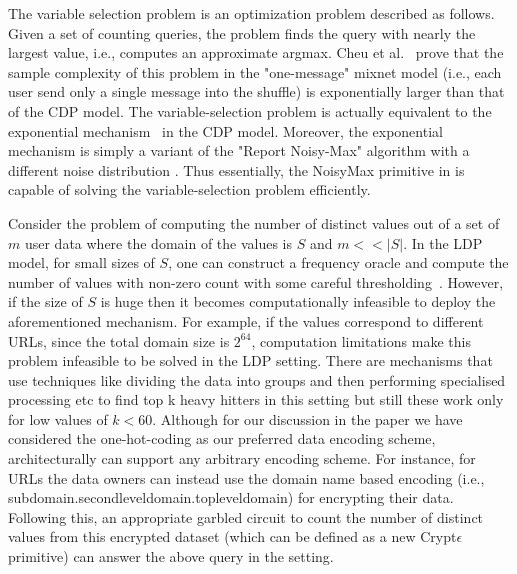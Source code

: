  The variable selection problem is an optimization problem described as follows. Given a set of counting queries, the problem finds the query with nearly the largest value, i.e., computes an approximate argmax. Cheu et al.~\cite{mixnets} prove that the sample complexity of this problem in the "one-message" mixnet model (i.e., each user send only a single message into the shuffle) is exponentially larger than that of the \textsf{CDP} model. The variable-selection problem is actually equivalent to the exponential mechanism~\cite{Dork} in the \textsf{CDP} model. Moreover, the exponential mechanism is simply a variant of the "Report Noisy-Max" algorithm with a different noise distribution \cite{Nm}.  Thus essentially, the \textsf{NoisyMax} primitive in \system is capable of solving the variable-selection problem efficiently.

 Consider the problem of computing the number of distinct values out of a set of $m$ user data where the domain of the values is $S$ and $m<<|S|$. In the \textsf{LDP} model, for small sizes of $S$, one can construct a frequency oracle and compute the number of values with non-zero count with some careful thresholding~\cite{LDP1}. However, if the size of $S$ is huge then it becomes computationally infeasible to deploy the aforementioned mechanism. For example, if the values correspond to different URLs, since the total domain size is $2^{64}$, computation limitations make this problem infeasible to be solved in the \textsf{LDP} setting. There are mechanisms that use techniques like dividing the data into groups and then performing specialised processing etc to find top k heavy hitters in this setting \cite{HH,HH2} but still these work only for low values of $k<60$.  Although for our discussion in the paper we have considered the one-hot-coding as our preferred data encoding scheme, \system architecturally can support any arbitrary encoding scheme.  For instance, for URLs the data owners can instead use the domain name based encoding (i.e., subdomain.secondleveldomain.topleveldomain) for encrypting their data. Following this, an appropriate garbled circuit to count the number of distinct values from this encrypted dataset (which can be defined as a new Crypt$\epsilon$ primitive) can answer the above query in the \system setting.

